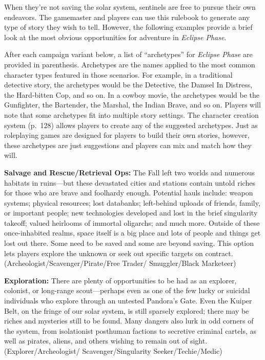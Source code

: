 When they're not saving the solar system, sentinels are 
free to pursue their own endeavors. The gamemaster 
and players can use this rulebook to generate any 
type of story they wish to tell. However, the following 
examples provide a brief look at the most obvious opportunities for adventure in \textit{Eclipse Phase}.

After each campaign variant below, a list of ``archetypes'' for \textit{Eclipse Phase} are provided in parenthesis. Archetypes are the names applied to the most 
common character types featured in those scenarios. 
For example, in a traditional detective story, the archetypes would be the Detective, the Damsel In Distress, the Hard-bitten Cop, and so on. In a cowboy 
movie, the archetypes would be the Gunfighter, the 
Bartender, the Marshal, the Indian Brave, and so 
on. Players will note that some archetypes fit into 
multiple story settings. The character creation system 
(p. 128) allows players to create any of the suggested 
archetypes. Just as roleplaying games are designed 
for players to build their own stories, however, these 
archetypes are just suggestions and players can mix 
and match how they will.

\textbf{Salvage and Rescue/Retrieval Ops:} The Fall left 
two worlds and numerous habitats in ruins—but 
these devastated cities and stations contain untold 
riches for those who are brave and foolhardy 
enough. Potential hauls include: weapon systems; 
physical resources; lost databanks; left-behind uploads of friends, family, or important people; new 
technologies developed and lost in the brief singularity takeoff; valued heirlooms of immortal oligarchs; 
and much more. Outside of these once-inhabited 
realms, space itself is a big place and lots of people 
and things get lost out there. Some need to be saved 
and some are beyond saving. This option lets players 
explore the unknown or seek out specific targets on 
contract. (Archeologist/Scavenger/Pirate/Free Trader/
Smuggler/Black Marketeer)

\textbf{Exploration:} There are plenty of opportunities 
to be had as an explorer, colonist, or long-range 
scout—perhaps even as one of the few lucky or suicidal individuals who explore through an untested 
Pandora's Gate. Even the Kuiper Belt, on the fringe 
of our solar system, is still sparsely explored; there 
may be riches and mysteries still to be found. Many 
dangers also lurk in odd corners of the system, from 
isolationist posthuman factions to secretive criminal 
cartels, as well as pirates, aliens, and others wishing to remain out of sight. (Explorer/Archeologist/
Scavenger/Singularity Seeker/Techie/Medic)

